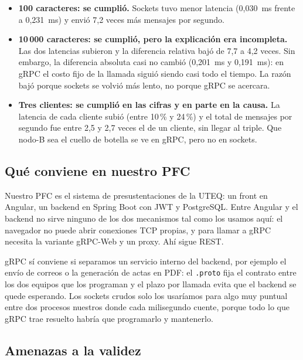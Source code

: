 \documentclass[11pt,a4paper]{article}
\begin{document}
\begin{itemize}[leftmargin=*]
  \item \textbf{100 caracteres: se cumplió.} Sockets tuvo menor latencia (0,030~ms frente a 0,231~ms) y envió 7,2 veces más mensajes por segundo.
  \item \textbf{10\,000 caracteres: se cumplió, pero la explicación era incompleta.} Las dos latencias subieron y la diferencia relativa bajó de 7,7 a 4,2 veces. Sin embargo, la diferencia absoluta casi no cambió (0,201~ms y 0,191~ms): en gRPC el costo fijo de la llamada siguió siendo casi todo el tiempo. La razón bajó porque sockets se volvió más lento, no porque gRPC se acercara.
  \item \textbf{Tres clientes: se cumplió en las cifras y en parte en la causa.} La latencia de cada cliente subió (entre 10\,\% y 24\,\%) y el total de mensajes por segundo fue entre 2,5 y 2,7 veces el de un cliente, sin llegar al triple. Que nodo-B sea el cuello de botella se ve en gRPC, pero no en sockets.
\end{itemize}

\subsection{Qué conviene en nuestro PFC}

Nuestro PFC es el sistema de presustentaciones de la UTEQ: un front en Angular, un backend en Spring Boot con JWT y PostgreSQL. Entre Angular y el backend no sirve ninguno de los dos mecanismos tal como los usamos aquí: el navegador no puede abrir conexiones TCP propias, y para llamar a gRPC necesita la variante gRPC-Web y un proxy. Ahí sigue REST.

gRPC sí conviene si separamos un servicio interno del backend, por ejemplo el envío de correos o la generación de actas en PDF: el \texttt{.proto} fija el contrato entre los dos equipos que los programan y el plazo por llamada evita que el backend se quede esperando. Los sockets crudos solo los usaríamos para algo muy puntual entre dos procesos nuestros donde cada milisegundo cuente, porque todo lo que gRPC trae resuelto habría que programarlo y mantenerlo.

\subsection{Amenazas a la validez}
\end{document}
